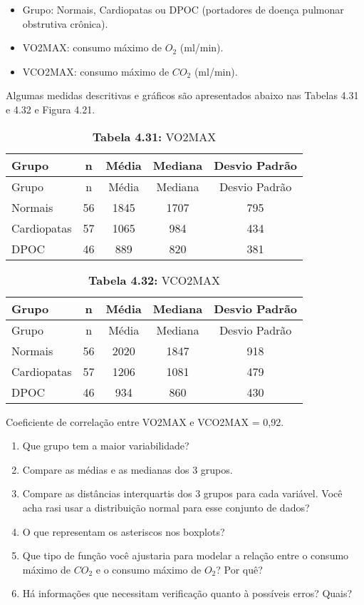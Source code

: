 \documentclass[
]{latex/krantz}
\providecommand{\tightlist}{%
  \setlength{\itemsep}{0pt}\setlength{\parskip}{0pt}}
\theoremstyle{definition}
\theoremstyle{definition}
\theoremstyle{definition}
\theoremstyle{definition}
\theoremstyle{remark}
\begin{document}
\begin{itemize}
\tightlist
\item
  Grupo: Normais, Cardiopatas ou DPOC (portadores de doença pulmonar obstrutiva crônica).
\item
  VO2MAX: consumo máximo de \(O_2\) (ml/min).
\item
  VCO2MAX: consumo máximo de \(CO_2\) (ml/min).
\end{itemize}

Algumas medidas descritivas e gráficos são apresentados abaixo nas Tabelas 4.31 e 4.32 e Figura 4.21.

\begin{longtable}[]{@{}lcccc@{}}
\caption{\textbf{Tabela 4.31:} VO2MAX}\tabularnewline
\toprule\noalign{}
Grupo & n & Média & Mediana & Desvio Padrão \\
\midrule\noalign{}
\endfirsthead
\toprule\noalign{}
Grupo & n & Média & Mediana & Desvio Padrão \\
\midrule\noalign{}
\endhead
\bottomrule\noalign{}
\endlastfoot
Normais & 56 & 1845 & 1707 & 795 \\
Cardiopatas & 57 & 1065 & 984 & 434 \\
DPOC & 46 & 889 & 820 & 381 \\
\end{longtable}

\begin{longtable}[]{@{}lcccc@{}}
\caption{\textbf{Tabela 4.32:} VCO2MAX}\tabularnewline
\toprule\noalign{}
Grupo & n & Média & Mediana & Desvio Padrão \\
\midrule\noalign{}
\endfirsthead
\toprule\noalign{}
Grupo & n & Média & Mediana & Desvio Padrão \\
\midrule\noalign{}
\endhead
\bottomrule\noalign{}
\endlastfoot
Normais & 56 & 2020 & 1847 & 918 \\
Cardiopatas & 57 & 1206 & 1081 & 479 \\
DPOC & 46 & 934 & 860 & 430 \\
\end{longtable}

Coeficiente de correlação entre VO2MAX e VCO2MAX = 0,92.

\begin{enumerate}
\def\labelenumi{\alph{enumi}.}
\tightlist
\item
  Que grupo tem a maior variabilidade?
\item
  Compare as médias e as medianas dos 3 grupos.
\item
  Compare as distâncias interquartis dos 3 grupos para cada variável. Você acha rasi usar a distribuição normal para esse conjunto de dados?
\item
  O que representam os asteriscos nos boxplots?
\item
  Que tipo de função você ajustaria para modelar a relação entre o consumo máximo de \(CO_2\) e o consumo máximo de \(O_2\)? Por quê?
\item
  Há informações que necessitam verificação quanto à possíveis erros? Quais?
\end{enumerate}
\end{document}
